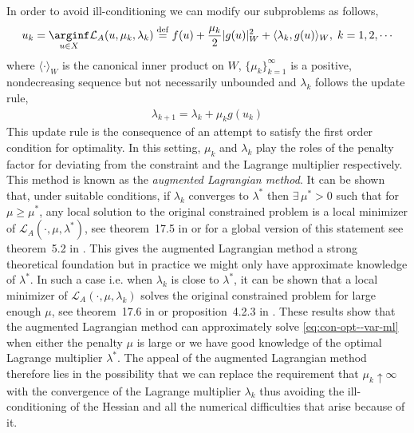 In order to avoid ill-conditioning we can modify our subproblems as follows,
\begin{align}
    u_k=\underset{u\in X}\arginf\mathcal L_A(u, \mu_k, \lambda_k)\stackrel{\rm def}{=} f(u) + \frac{\mu_k}{2}|g(u)|_W^2 + \langle\lambda_k, g(u)\rangle_W,\;k=1,2,\cdots\label{eq:seq-uncon-al--var-ml}
\end{align}
where $\langle\cdot\rangle_W$ is the canonical inner product on $W$, $\{\mu_k\}_{k=1}^\infty$ is a positive, nondecreasing sequence but not necessarily unbounded and $\lambda_k$ follows the update rule,
\begin{align}
    \lambda_{k+1} = \lambda_k + \mu_k g(u_k)\label{eq:mul-update--var-ml}
\end{align}
This update rule is the consequence of an attempt to satisfy the first order condition for optimality. In this setting, $\mu_k$ and $\lambda_k$ play the roles of the penalty factor for deviating from the constraint and the Lagrange multiplier respectively. This method is known as the \textit{augmented Lagrangian method}. It can be shown that, under suitable conditions, if $\lambda_k$ converges to $\lambda^*$ then $\exists \,\mu^*>0$ such that for $\mu\ge\mu^*$, any local solution to the original constrained problem is a local minimizer of $\mathcal L_A(\cdot, \mu, \lambda^*)$, see theorem~17.5 in \cite{jorge2006numerical} or for a global version of this statement see theorem~5.2 in \cite{birgin2014practical}. This gives the augmented Lagrangian method a strong theoretical foundation but in practice we might only have approximate knowledge of $\lambda^*$. In such a case i.e. when $\lambda_k$ is close to $\lambda^*$, it can be shown that a local minimizer of $\mathcal L_A(\cdot, \mu, \lambda_k)$ solves the original constrained problem for large enough $\mu$, see theorem~17.6 in \cite{jorge2006numerical} or proposition~4.2.3 in \cite{bertsekas1995athena}. These results show that the augmented Lagrangian method can approximately solve \eqref{eq:con-opt--var-ml} when either the penalty $\mu$ is large or we have good knowledge of the optimal Lagrange multiplier $\lambda^*$. The appeal of the augmented Lagrangian method therefore lies in the possibility that we can replace the requirement that $\mu_k\uparrow\infty$ with the convergence of the Lagrange multiplier $\lambda_k$ thus avoiding the ill-conditioning of the Hessian and all the numerical difficulties that arise because of it. 



